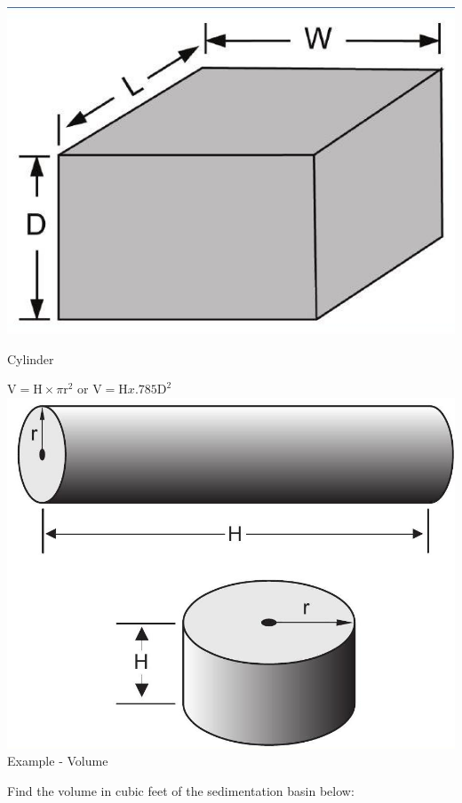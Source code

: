 \documentclass[10pt]{article}
\begin{document}
\includegraphics[max width=\textwidth]{2022_09_11_72dbedc910e6e984560cg-29}

Cylinder

$\mathrm{V}=\mathrm{H} \times \pi \mathrm{r}^{2}$ or $\mathrm{V}=\mathrm{H} x .785 \mathrm{D}^{2}$\\

\includegraphics[max width=\textwidth]{2022_09_11_72dbedc910e6e984560cg-29(1)}Example - Volume

Find the volume in cubic feet of the sedimentation basin below:
\end{document}
